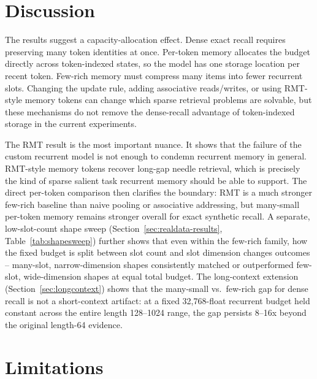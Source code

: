 \documentclass[10pt]{article} %
\begin{document}
\section{Discussion}

The results suggest a capacity-allocation effect. Dense exact recall
requires preserving many token identities at once. Per-token memory
allocates the budget directly across token-indexed states, so the model
has one storage location per recent token. Few-rich memory must compress
many items into fewer recurrent slots. Changing the update rule, adding
associative reads/writes, or using RMT-style memory tokens can change which
sparse retrieval problems are solvable, but these mechanisms do not remove
the dense-recall advantage of token-indexed storage in the current
experiments.

The RMT result is the most important nuance. It shows that the failure of
the custom recurrent model is not enough to condemn recurrent memory in
general. RMT-style memory tokens recover long-gap needle retrieval, which
is precisely the kind of sparse salient task recurrent memory should be
able to support. The direct per-token comparison then clarifies the
boundary: RMT is a much stronger few-rich baseline than naive pooling or
associative addressing, but many-small per-token memory remains stronger
overall for exact synthetic recall. A separate, low-slot-count shape sweep
(Section~\ref{sec:realdata-results}, Table~\ref{tab:shapesweep}) further shows that even within the
few-rich family, how the fixed budget is split between slot count and slot
dimension changes outcomes -- many-slot, narrow-dimension shapes
consistently matched or outperformed few-slot, wide-dimension shapes at
equal total budget. The long-context extension (Section~\ref{sec:longcontext})
shows that the many-small vs.\ few-rich gap for dense recall is not a
short-context artifact: at a fixed 32,768-float recurrent budget held
constant across the entire length 128--1024 range, the gap persists
8--16x beyond the original length-64 evidence.

\section{Limitations}
\end{document}
